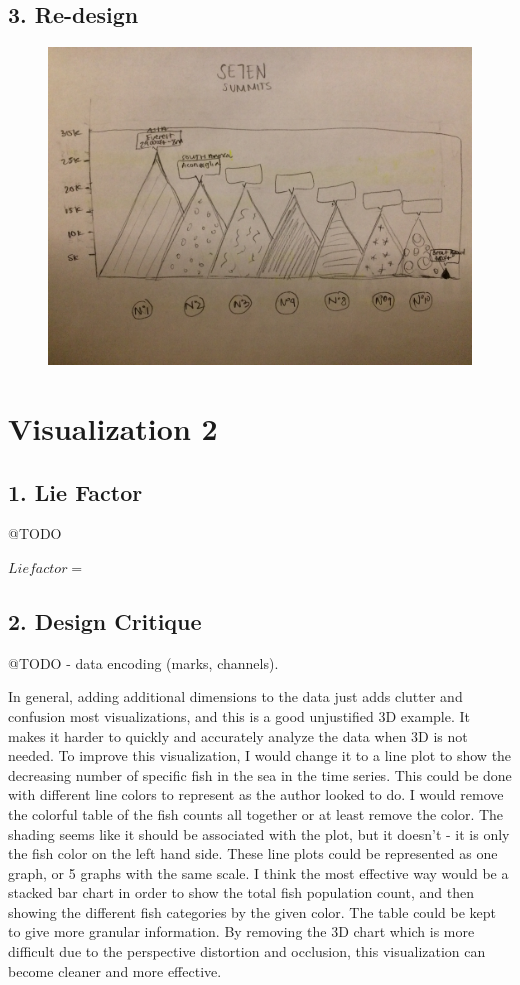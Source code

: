 \documentclass{neu_handout}
\begin{document}
\subsection*{3. Re-design}

\begin{figure}[h]
\centering
{
\includegraphics[width=0.6\linewidth]{part2_1}
}
\end{figure}


\section*{Visualization 2}

\subsection*{1. Lie Factor}

@TODO

$ Lie factor = $


\subsection*{2. Design Critique}

@TODO - data encoding (marks, channels).

In general, adding additional dimensions to the data just adds clutter and confusion most visualizations, and this is a good unjustified 3D example. It makes it harder to quickly and accurately analyze the data when 3D is not needed. To improve this visualization, I would change it to a line plot to show the decreasing number of specific fish in the sea in the time series. This could be done with different line colors to represent as the author looked to do. I would remove the colorful table of the fish counts all together or at least remove the color. The shading seems like it should be associated with the plot, but it doesn't - it is only the fish color on the left hand side. These line plots could be represented as one graph, or 5 graphs with the same scale. I think the most effective way would be a stacked bar chart in order to show the total fish population count, and then showing the different fish categories by the given color. The table could be kept to give more granular information. By removing the 3D chart which is more difficult due to the perspective distortion and occlusion, this visualization can become cleaner and more effective.
\end{document}
